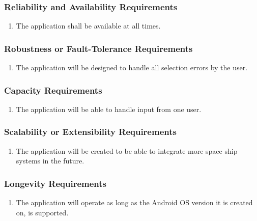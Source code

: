 \documentclass[12pt, titlepage]{article}
\begin{document}
\subsubsection{Reliability and Availability Requirements}
\label{ssub:reliability_and_availability_requirements}
\begin{enumerate}[{PR}1. ]
	\item The application shall be available at all times.
\end{enumerate}

\subsubsection{Robustness or Fault-Tolerance Requirements}
\label{ssub:robustness_or_fault_tolerance_requirements}
\begin{enumerate}[{PR}1. ]
	\item The application will be designed to handle all selection errors by the user.
\end{enumerate}

\subsubsection{Capacity Requirements}
\label{ssub:capacity_requirements}
\begin{enumerate}[{PR}1. ]
	\item The application will be able to handle input from one user.
\end{enumerate}

\subsubsection{Scalability or Extensibility Requirements}
\label{ssub:scalability_or_extensibility_requirements}
\begin{enumerate}[{PR}1. ]
	\item The application will be created to be able to integrate more space ship systems in the future.
\end{enumerate}

\subsubsection{Longevity Requirements}
\label{ssub:longevity_requirements}
\begin{enumerate}[{PR}1. ]
	\item The application will operate as long as the Android OS version it is created on, is supported.
\end{enumerate}
\end{document}
